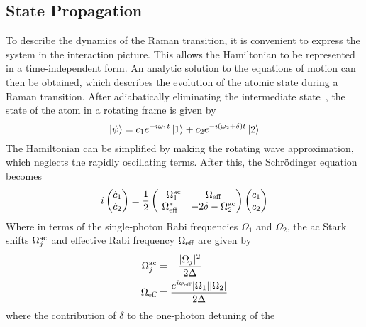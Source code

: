 \subsection{State Propagation}
To describe the dynamics of the Raman transition, it is convenient to
express the system in the interaction picture. This allows the
Hamiltonian to be represented in a time-independent form. An analytic
solution to the equations of motion can then be obtained, which
describes the evolution of the atomic state during a Raman transition. After adiabatically
eliminating the intermediate state~\cite{Weiss1994}, the state of the
atom in a rotating frame is given by
\begin{equation}
  \label{eq:state_raman}
  \ket{\psi} = c_1 e^{-i \omega_1 t}\ket{1} + c_2 e^{-i (\omega_2 +
  \delta) t} \ket{2}
\end{equation}
The Hamiltonian can be simplified by making the rotating wave
approximation, which neglects the rapidly oscillating terms. After
this, the Schr\"odinger equation becomes
\begin{equation}
  \label{eq:raman_eom}
  i \begin{pmatrix} \dot{c}_1 \\ \dot{c}_2 \end{pmatrix} =
  \frac{1}{2} \begin{pmatrix}
    -\Omega_1^\textnormal{ac} & \Omega_\textnormal{eff} \\
    \Omega_\textnormal{eff}^*&  -2 \delta - \Omega_2^\textnormal{ac}  \\
    \end{pmatrix} \begin{pmatrix} c_1 \\ c_2\end{pmatrix}
\end{equation}
Where in terms of the single-photon Rabi frequencies $\Omega_1$ and
$\Omega_2$, the ac Stark shifts $\Omega_j^\textnormal{ac}$ and
effective Rabi frequency $\Omega_\textnormal{eff}$ are given by 
\begin{subequations}
\begin{align}
  \Omega_j^\textnormal{ac} &= -\frac{|\Omega_j|^2}{2 \Delta
  }\label{eq:raman_ac_stark}\\
  \Omega_\textnormal{eff}&=\frac{e^{i\phi_\textnormal{eff}} |\Omega_1|
    |\Omega_2|}{2 \Delta }\label{eq:raman_rabi} 
\end{align}
\end{subequations}
where the contribution of $\delta$ to the one-photon detuning of the
